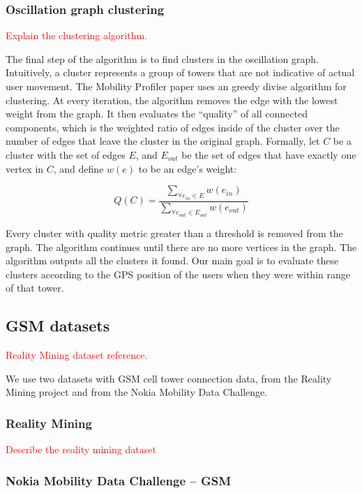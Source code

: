 \documentclass[letterpaper, 11pt, conference]{ieeeconf}
\newcommand{\xxx}[1]{\textcolor{red}{#1}}
\begin{document}
\subsubsection{Oscillation graph clustering}

\xxx{Explain the clustering algorithm.}

The final step of the algorithm is to find clusters in the oscillation graph. Intuitively, a cluster represents a group of towers that are not indicative of actual user movement. The Mobility Profiler paper uses an greedy divise algorithm for clustering. At every iteration, the algorithm removes the edge with the lowest weight from the graph. It then evaluates the ``quality'' of all connected components, which is the weighted ratio of edges inside of the cluster over the number of edges that leave the cluster in the original graph. Formally, let $C$ be a cluster with the set of edges $E$, and $E_{out}$ be the set of edges that have exactly one vertex in $C$, and define $w(e)$ to be an edge's weight:

\begin{equation*}
Q(C) = \frac{\displaystyle\sum_{\forall e_{in} \in E}{w(e_{in})}}{\displaystyle\sum_{\forall e_{out} \in E_{out}}{w(e_{out})}}
\end{equation*}

Every cluster with quality metric greater than a threshold is removed from the graph. The algorithm continues until there are no more vertices in the graph. The algorithm outputs all the clusters it found. Our main goal is to evaluate these clusters according to the GPS position of the users when they were within range of that tower.

\subsection{GSM datasets}

\xxx{Reality Mining dataset reference.}

We use two datasets with GSM cell tower connection data, from the Reality Mining project and from the Nokia Mobility Data Challenge.

\subsubsection{Reality Mining}

\xxx{Describe the reality mining dataset}

\subsubsection{Nokia Mobility Data Challenge -- GSM}
\end{document}
